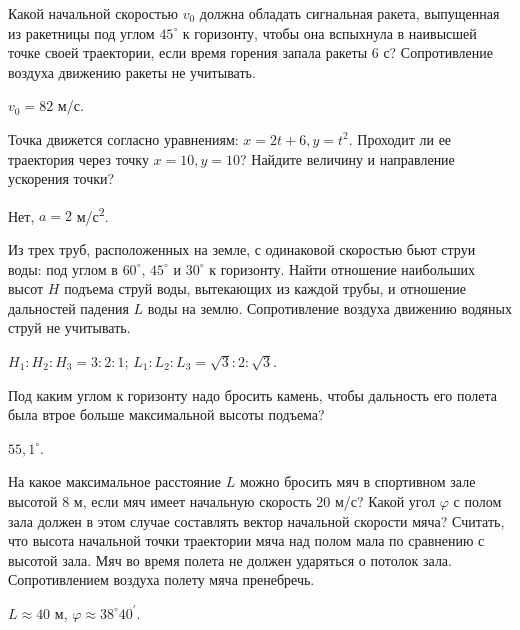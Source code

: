 \simpleProblems

\begin{ex} %
Какой начальной скоростью $v_0$ должна обладать сигнальная ракета, выпущенная из ракетницы под углом $45^{\circ}$ к горизонту, чтобы она вспыхнула в наивысшей точке своей траектории, если время горения запала ракеты 6 с? Сопротивление воздуха движению ракеты не учитывать.
\begin{ans}
$v_0 = 82$ м/с.
\end{ans}
\end{ex}	

\begin{ex} %
Точка движется согласно уравнениям: $x = 2t + 6, y = t^2$. Проходит ли ее траектория через точку $x = 10, y = 10$? Найдите величину и направление ускорения точки?
\begin{ans}
Нет, $a = 2$ м/с\textsuperscript{2}.
\end{ans}
\end{ex}	

\begin{ex} %
Из трех труб, расположенных на земле, с одинаковой скоростью бьют струи воды: под углом в $60^{\circ}$, $45^{\circ}$ и $30^{\circ}$ к горизонту. Найти отношение наибольших высот $H$ подъема струй воды, вытекающих из каждой трубы, и отношение дальностей падения $L$ воды на землю. Сопротивление воздуха движению водяных струй не учитывать.
\begin{ans}
$H_1 : H_2 : H_3 = 3 : 2 : 1$; $L_1 : L_2 : L_3 = \sqrt{3} : 2 : \sqrt{3}$.
\end{ans}
\end{ex}	

\begin{ex} %
Под каким углом к горизонту надо бросить камень, чтобы дальность его полета была втрое больше максимальной высоты подъема?
\begin{ans}
$55,1^{ \circ }$.
\end{ans}
\end{ex}	

\begin{ex} %
На какое максимальное расстояние $L$ можно бросить мяч в спортивном зале высотой 8 м, если мяч имеет начальную скорость 20 м/с? Какой угол $\varphi$ с полом зала должен в этом случае составлять вектор начальной скорости мяча? Считать, что высота начальной точки траектории мяча над полом мала по сравнению с высотой зала. Мяч во время полета не должен ударяться о потолок зала. Сопротивлением воздуха полету мяча пренебречь.
\begin{ans}
$L \approx 40$ м, $\varphi \approx 38^{\circ}40^\prime$.
\end{ans}
\end{ex}	

